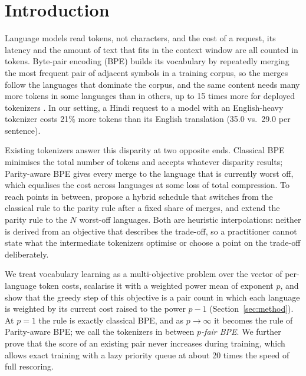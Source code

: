 \section{Introduction}
\label{sec:intro}

Language models read tokens, not characters, and the cost of a request, its latency and the
amount of text that fits in the context window are all counted in tokens. Byte-pair
encoding (BPE) \citep{gage1994,sennrich2016} builds its vocabulary by repeatedly merging the
most frequent pair of adjacent symbols in a training corpus, so the merges follow the
languages that dominate the corpus, and the same content needs many more tokens in some
languages than in others, up to 15 times more for deployed tokenizers \citep{petrov2023}.
In our setting, a Hindi request to a model with an English-heavy tokenizer costs 21\% more
tokens than its English translation (35.0 vs.\ 29.0 per sentence).

Existing tokenizers answer this disparity at two opposite ends. Classical BPE minimises the
total number of tokens and accepts whatever disparity results; Parity-aware BPE
\citep{foroutan2026} gives every merge to the language that is currently worst off, which
equalises the cost across languages at some loss of total compression. To reach points in
between, \citet{foroutan2026} propose a hybrid schedule that switches from the classical
rule to the parity rule after a fixed share of merges, and \citet{kanjirangat2026} extend
the parity rule to the $N$ worst-off languages. Both are heuristic interpolations: neither
is derived from an objective that describes the trade-off, so a practitioner cannot state
what the intermediate tokenizers optimise or choose a point on the trade-off deliberately.

We treat vocabulary learning as a multi-objective problem over the vector of per-language
token costs, scalarise it with a weighted power mean of exponent $p$, and show that the
greedy step of this objective is a pair count in which each language is weighted by its
current cost raised to the power $p-1$ (Section~\ref{sec:method}). At $p=1$ the rule is
exactly classical BPE, and as $p\to\infty$ it becomes the rule of Parity-aware BPE; we call
the tokenizers in between \emph{$p$-fair BPE}. We further prove that the score of an
existing pair never increases during training, which allows exact training with a lazy
priority queue \citep{minoux1978} at about 20 times the speed of full rescoring.

